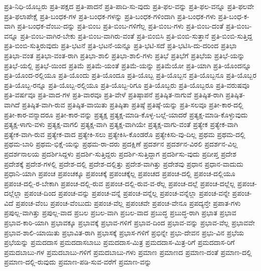 {ಪ್ರತಿ-ನಿಧಿ-ಯೊಬ್ಬರು
ಪ್ರತಿ-ಪಕ್ಷದ
ಪ್ರತಿ-ಪಾದನೆ
ಪ್ರತಿ-ಪಾದಿ-ಸು-ವುದು
ಪ್ರತಿ-ಫಲ-ವನ್ನು
ಪ್ರತಿ-ಫಲ-ವನ್ನೂ
ಪ್ರತಿ-ಫಲವೇ
ಪ್ರತಿ-ಫಲಾಪೇಕ್ಷೆ
ಪ್ರತಿ-ಬಂಧಕ-ಗಳ
ಪ್ರತಿ-ಬಂಧಕ-ಗಳನ್ನು
ಪ್ರತಿ-ಬಂಧಕ-ಗಳಿಂದಾಗಿ
ಪ್ರತಿ-ಬಂಧಕ-ಗಳು
ಪ್ರತಿ-ಬಂಧ-ಕ-ವಾಗಿ
ಪ್ರತಿ-ಬಂಧಕ-ವೆಂಬು-ದನ್ನು
ಪ್ರತಿ-ಬಿಂಬ
ಪ್ರತಿ-ಬಿಂಬ-ಗಳಿಗೆಲ್ಲ
ಪ್ರತಿ-ಬಿಂಬ-ಗಳು
ಪ್ರತಿ-ಬಿಂಬ-ದಂತೆ
ಪ್ರತಿ-ಬಿಂಬ-ವನ್ನೂ
ಪ್ರತಿ-ಬಿಂಬ-ವಾಗಿರ-ಬೇಕು
ಪ್ರತಿ-ಬಿಂಬ-ವಾಗಿರು-ವಂತೆ
ಪ್ರತಿ-ಬಿಂಬಿಸಿ
ಪ್ರತಿ-ಬಿಂಬಿ-ಸುತ್ತಾನೆ
ಪ್ರತಿ-ಬಿಂಬಿ-ಸುತ್ತಿದ್ದ
ಪ್ರತಿ-ಬಿಂಬಿ-ಸುತ್ತಿರುವುದು
ಪ್ರತಿ-ಭಟನೆ
ಪ್ರತಿ-ಭಟನೆ-ಯನ್ನೂ
ಪ್ರತಿ-ಭಟಿ-ಸದೆ
ಪ್ರತಿ-ಭಟಿಸಿ-ದು-ದರಿಂದ
ಪ್ರತಿಭಾ
ಪ್ರತಿಭಾ-ವಂತ
ಪ್ರತಿಭಾ-ವಂತ-ರಾಗಿ
ಪ್ರತಿಭಾ-ಶಾಲಿ
ಪ್ರತಿಭಾ-ಶಾಲಿ-ಗಳು
ಪ್ರತಿಭೆ
ಪ್ರತಿಭೆಗೆ
ಪ್ರತಿಭೆಯ
ಪ್ರತಿಭೆ-ಯನ್ನು
ಪ್ರತಿಭೆ-ಯಲ್ಲಿ
ಪ್ರತಿಭೆ-ಯಿಂದ
ಪ್ರತಿಮೆ
ಪ್ರತಿಮೆ-ಯಂತೆ
ಪ್ರತಿಮೆ-ಯನ್ನು
ಪ್ರತಿಮೆಯೋ
ಪ್ರತಿ-ಯಾಗಿ
ಪ್ರತಿ-ಯೊಂದನ್ನೂ
ಪ್ರತಿ-ಯೊಂದ-ರಲ್ಲಿಯೂ
ಪ್ರತಿ-ಯೊಂದು
ಪ್ರತಿ-ಯೊಂದೂ
ಪ್ರತಿ-ಯೊಬ್ಬ
ಪ್ರತಿ-ಯೊಬ್ಬನ
ಪ್ರತಿ-ಯೊಬ್ಬನೂ
ಪ್ರತಿ-ಯೊಬ್ಬರ
ಪ್ರತಿ-ಯೊಬ್ಬ-ರನ್ನೂ
ಪ್ರತಿ-ಯೊಬ್ಬ-ರಲ್ಲಿಯೂ
ಪ್ರತಿ-ಯೊಬ್ಬ-ರಿಗೂ
ಪ್ರತಿ-ಯೊಬ್ಬರು
ಪ್ರತಿ-ಯೊಬ್ಬರೂ
ಪ್ರತಿ-ವರುಷವೂ
ಪ್ರತಿ-ವರ್ಷವೂ
ಪ್ರತಿ-ವಾದ-ಗಳ
ಪ್ರತಿ-ವಾರವೂ
ಪ್ರತಿ-ವೇಳೆ
ಪ್ರತಿಷ್ಠಾಪನೆ
ಪ್ರತಿಷ್ಠಿತ-ನಾಗುವೆ
ಪ್ರತಿಷ್ಠಿತ-ರಾಗಿ
ಪ್ರತಿಷ್ಠಿತ-ವಾಗಿದೆ
ಪ್ರತಿಷ್ಠಿತ-ವಾಗಿ-ರುವ
ಪ್ರತಿಷ್ಠಿತ-ವಾಯಿತು
ಪ್ರತಿಷ್ಠಿತಾ
ಪ್ರತಿಷ್ಠೆ
ಪ್ರತಿಷ್ಠೆ-ಯನ್ನು
ಪ್ರತಿ-ಸಲವೂ
ಪ್ರತೀ-ಕಾರ-ದಲ್ಲಿ
ಪ್ರತೀ-ಕಾರ-ವನ್ನಾದರೂ
ಪ್ರತೀ-ಕಾರ-ವನ್ನು
ಪ್ರತ್ಯಕ್ಷ
ಪ್ರತ್ಯಕ್ಷ-ಮಾಡಿ-ಕೊಳ್ಳ-ಬಲ್ಲೆ-ಯಾದರೆ
ಪ್ರತ್ಯಕ್ಷ-ಮಾಡಿ-ಕೊಳ್ಳುವುದು
ಪ್ರತ್ಯಕ್ಷ-ಳಾಗು-ವಳು
ಪ್ರತ್ಯಕ್ಷ-ವಾಗಲಿ
ಪ್ರತ್ಯಕ್ಷ-ವಾಗಿ
ಪ್ರತ್ಯಕ್ಷ-ವಾಗಿಯೇ
ಪ್ರತ್ಯಕ್ಷ-ವಾಗು-ವಂತೆ
ಪ್ರತ್ಯೇಕ
ಪ್ರತ್ಯೇಕ-ವಾಗಿ
ಪ್ರತ್ಯೇಕ-ವಾಗಿ-ರುವ
ಪ್ರತ್ಯೇಕ-ವಾದ
ಪ್ರತ್ಯೇಕಿ-ಸಲು
ಪ್ರತ್ಯೇಕಿಸಿ-ಕೊಂಡರೊ
ಪ್ರತ್ಯೇಕಿಸು-ವು-ದಿಲ್ಲ
ಪ್ರಥಮ
ಪ್ರಥಮ-ದಲ್ಲಿ
ಪ್ರಥಮ-ಬಾರಿ
ಪ್ರಥಮ-ಭಿಕ್ಷೆ-ಯನ್ನು
ಪ್ರಥಮ-ರಾ-ದರು
ಪ್ರದಕ್ಷಿಣೆ
ಪ್ರದರ್ಶನ
ಪ್ರದರ್ಶನ-ವಿರಲಿ
ಪ್ರದರ್ಶನ-ವಿಲ್ಲ
ಪ್ರದರ್ಶನಾಲಯ
ಪ್ರದರ್ಶಿಸಿದ್ದಳು
ಪ್ರದರ್ಶಿ-ಸುತ್ತಿದ್ದರು
ಪ್ರದರ್ಶಿ-ಸುತ್ತಿದ್ದಾಗ
ಪ್ರದರ್ಶಿಸು-ವುದು
ಪ್ರದೀಪ್ತ
ಪ್ರದೇಶ
ಪ್ರದೇಶಕ್ಕೆ
ಪ್ರದೇಶ-ಗಳಲ್ಲಿ
ಪ್ರದೇಶ-ದಲ್ಲಿ
ಪ್ರದೇಶ-ದಲ್ಲಿತ್ತು
ಪ್ರದೇಶ-ವಾಗಿತ್ತು
ಪ್ರದೇಶವು
ಪ್ರಧಾನ
ಪ್ರಧಾನ-ವಾದುದು
ಪ್ರಧಾನಿ-ಯಾಗಿ
ಪ್ರಪಂಚ
ಪ್ರಪಂಚಕ್ಕೂ
ಪ್ರಪಂಚಕ್ಕೆ
ಪ್ರಪಂಚಕ್ಕೆಲ್ಲ
ಪ್ರಪಂಚದ
ಪ್ರಪಂಚ-ದಲ್ಲಿ
ಪ್ರಪಂಚ-ದಲ್ಲಿಯೂ
ಪ್ರಪಂಚ-ದಲ್ಲಿ-ರ-ಬೇಕಾಗಿ
ಪ್ರಪಂಚ-ದಲ್ಲಿ-ರುವ
ಪ್ರಪಂಚ-ದಲ್ಲಿ-ರುವ-ವ-ರೆಲ್ಲ
ಪ್ರಪಂಚ-ದಲ್ಲೆ
ಪ್ರಪಂಚ-ದಲ್ಲೆಲ್ಲ
ಪ್ರಪಂಚ-ದಲ್ಲೆಲ್ಲಾ
ಪ್ರಪಂಚ-ದಿಂದ
ಪ್ರಪಂಚ-ವನ್ನು
ಪ್ರಪಂಚ-ವನ್ನೆ
ಪ್ರಪಂಚ-ವನ್ನೆಲ್ಲ
ಪ್ರಪಂಚ-ವನ್ನೆಲ್ಲಾ
ಪ್ರಪಂಚ-ವನ್ನೇ
ಪ್ರಪಂಚ-ವಿದೆ
ಪ್ರಪಂಚ-ವೆಂಬ
ಪ್ರಪಂಚ-ವೆಂಬುದು
ಪ್ರಪಂಚ-ವೆಲ್ಲ
ಪ್ರಪಂಚವೇ
ಪ್ರಪಂಚ-ವೇನೂ
ಪ್ರಪದ್ಯನ್ತೇ
ಪ್ರಪಾತ-ಗಳು
ಪ್ರಪುಲ್ಲ-ವಾಗಿತ್ತು
ಪ್ರಪುಲ್ಲ-ವಾದ
ಪ್ರಬಲ
ಪ್ರಬಲ-ವಾಗಿ
ಪ್ರಬಲ-ವಾದ
ಪ್ರಬುದ್ಧ
ಪ್ರಬುದ್ಧ-ರಾಗಿ
ಪ್ರಭಾತ
ಪ್ರಭಾವ
ಪ್ರಭಾವ-ಕಾರಿ-ಯಾಗಿ
ಪ್ರಭಾವಕ್ಕೂ
ಪ್ರಭಾವಕ್ಕೆ
ಪ್ರಭಾವ-ಗಳಿಗೆ
ಪ್ರಭಾವ-ದಿಂದ
ಪ್ರಭಾವ-ವನ್ನು
ಪ್ರಭಾವ-ವೆಲ್ಲ
ಪ್ರಭಾವವೇ
ಪ್ರಭಾವ-ಶಾಲಿ-ಯಾಯಿತು
ಪ್ರಭಾವಿತ-ರಾಗಿ
ಪ್ರಭಾಸಕ್ಕೆ
ಪ್ರಭಾಸ-ಗಳಿಗೆ
ಪ್ರಭಿನ್ನೇ
ಪ್ರಭು-ದೇವನ
ಪ್ರಭು-ವಿನ
ಪ್ರಭೆಯ
ಪ್ರಭೆಯನ್ನು
ಪ್ರಮದದಾಸ
ಪ್ರಮದದಾಸಬಾಬು
ಪ್ರಮದದಾಸ-ಮಿತ್ರ
ಪ್ರಮದದಾಸ-ಮಿತ್ರ-ರಿಗೆ
ಪ್ರಮದದಾಸ-ರಿಗೆ
ಪ್ರಮದಬಾಬು-ಗಳ
ಪ್ರಮದಬಾಬು-ಗಳಿಗೆ
ಪ್ರಮದಬಾಬು-ಗಳು
ಪ್ರಮಾಣ
ಪ್ರಮಾಣದ
ಪ್ರಮಾಣ-ದಂತೆ
ಪ್ರಮಾಣ-ದಲ್ಲಿ
ಪ್ರಮಾಣ-ದಲ್ಲಿ-ರುವುದು
ಪ್ರಮಾಣ-ಪಡಿ-ಸುವ-ವರೆಗೆ
ಪ್ರಮಾಣ-ವನ್ನು
}
